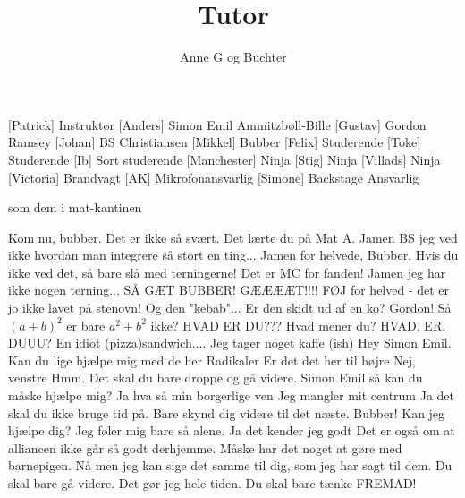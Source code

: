 \documentclass[a4paper,11pt]{article}
\title{Tutor}
\author{Anne G og Buchter}
\begin{document}
\maketitle

\begin{roles}
[Patrick] Instruktør
[Anders] Simon Emil Ammitzbøll-Bille
[Gustav] Gordon Ramsey
[Johan] BS Christiansen
[Mikkel] Bubber
[Felix] Studerende
[Toke] Studerende
[Ib] Sort studerende
[Manchester] Ninja
[Stig] Ninja
[Villads] Ninja
[Victoria] Brandvagt
[AK] Mikrofonansvarlig
[Simone] Backstage Ansvarlig
\end{roles}

\begin{props}
     som dem i mat-kantinen
\end{props}

\begin{sketch}
 Kom nu, bubber. Det er ikke så svært. Det lærte du på Mat A.
 Jamen BS jeg ved ikke hvordan man integrere så stort en ting...
 Jamen for helvede, Bubber. Hvis du ikke ved det, så bare slå med terningerne! Det er MC for fanden!
 Jamen jeg har ikke nogen terning...
 SÅ GÆT BUBBER! GÆÆÆÆT!!!!
 FØJ for helved - det er jo ikke lavet på stenovn! Og den "kebab"... Er den skidt ud af en ko?
  Gordon! Så $(a+b)^{2}$ er bare $a^{2}+b^{2}$ ikke?
 HVAD ER DU???
 Hvad mener du?
 HVAD. ER. DUUU?
 En idiot (pizza)sandwich.... Jeg tager noget kaffe (ish)
 Hey Simon Emil. Kan du lige hjælpe mig med de her Radikaler
 Er det det her til højre
 Nej, venstre
 Hmm. Det skal du bare droppe og gå videre.
 Simon Emil så kan du måske hjælpe mig?
 Ja hva så min borgerlige ven
 Jeg mangler mit centrum
 Ja det skal du ikke bruge tid på. Bare skynd dig videre til det næste.
  Bubber! Kan jeg hjælpe dig?
 Jeg føler mig bare så alene. 
 Ja det kender jeg godt \smiley
{} Det er også om at alliancen ikke går så godt derhjemme. Måske har det noget at gøre med barnepigen.
 Nå men jeg kan sige det samme til dig, som jeg har sagt til dem. Du skal bare gå videre. Det gør jeg hele tiden. Du skal bare tænke FREMAD!


\end{sketch}
\end{document}

